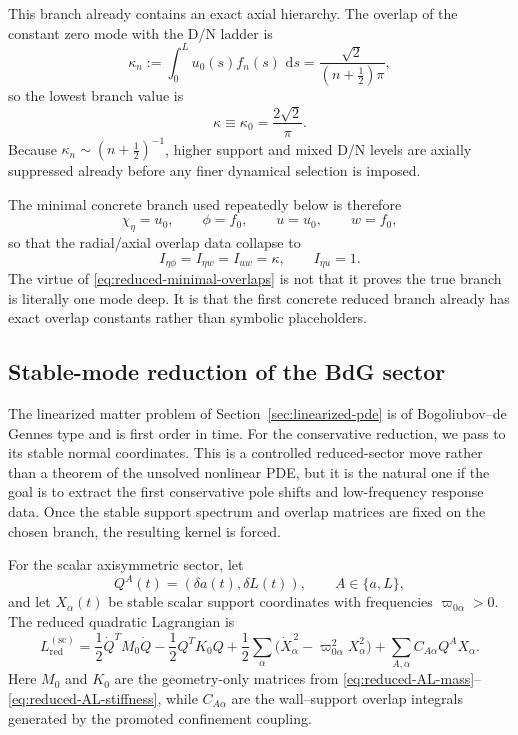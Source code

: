 \documentclass[11pt]{article}
\theoremstyle{definition}
\newcommand{\dd}{\,\mathrm{d}}
\begin{document}
This branch already contains an exact axial hierarchy. The overlap of the constant zero mode with the D/N ladder is
\begin{equation}
\kappa_n
:=
\int_0^L u_0(s)f_n(s)\,\dd s
=
\frac{\sqrt2}{\left(n+\frac12\right)\pi},
\label{eq:reduced-kappa-n}
\end{equation}
so the lowest branch value is
\begin{equation}
\kappa\equiv\kappa_0=\frac{2\sqrt2}{\pi}.
\label{eq:reduced-kappa0}
\end{equation}
Because $\kappa_n\sim (n+\tfrac12)^{-1}$, higher support and mixed D/N levels are axially suppressed already before any finer dynamical selection is imposed.

The minimal concrete branch used repeatedly below is therefore
\begin{equation}
\chi_\eta=u_0,
\qquad
\phi=f_0,
\qquad
u=u_0,
\qquad
w=f_0,
\label{eq:reduced-minimal-axial-branch}
\end{equation}
so that the radial/axial overlap data collapse to
\begin{equation}
I_{\eta\phi}=I_{\eta w}=I_{uw}=\kappa,
\qquad
I_{\eta u}=1.
\label{eq:reduced-minimal-overlaps}
\end{equation}
The virtue of \eqref{eq:reduced-minimal-overlaps} is not that it proves the true branch is literally one mode deep. It is that the first concrete reduced branch already has exact overlap constants rather than symbolic placeholders.

\subsection{Stable-mode reduction of the BdG sector}

The linearized matter problem of Section~\ref{sec:linearized-pde} is of Bogoliubov--de Gennes type and is first order in time. For the conservative reduction, we pass to its stable normal coordinates. This is a controlled reduced-sector move rather than a theorem of the unsolved nonlinear PDE, but it is the natural one if the goal is to extract the first conservative pole shifts and low-frequency response data. Once the stable support spectrum and overlap matrices are fixed on the chosen branch, the resulting kernel is forced.

For the scalar axisymmetric sector, let
\[
Q^A(t)=(\delta a(t),\delta L(t)),
\qquad
A\in\{a,L\},
\]
and let $X_\alpha(t)$ be stable scalar support coordinates with frequencies $\varpi_{0\alpha}>0$. The reduced quadratic Lagrangian is
\begin{equation}
L_{\mathrm{red}}^{(\mathrm{sc})}
=
\frac12 \dot Q^T M_0 \dot Q
-
\frac12 Q^T K_0 Q
+
\frac12\sum_\alpha \bigl(\dot X_\alpha^{\,2}-\varpi_{0\alpha}^2 X_\alpha^2\bigr)
+
\sum_{A,\alpha} C_{A\alpha} Q^A X_\alpha.
\label{eq:reduced-scalar-bdg-lagrangian}
\end{equation}
Here $M_0$ and $K_0$ are the geometry-only matrices from \eqref{eq:reduced-AL-mass}--\eqref{eq:reduced-AL-stiffness}, while $C_{A\alpha}$ are the wall--support overlap integrals generated by the promoted confinement coupling.
\end{document}
